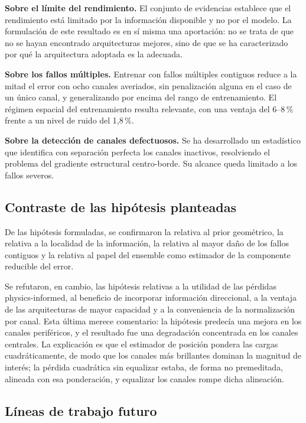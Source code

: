 \textbf{Sobre el límite del rendimiento.} El conjunto de evidencias establece que el rendimiento
está limitado por la información disponible y no por el modelo. La formulación de este resultado es
en sí misma una aportación: no se trata de que no se hayan encontrado arquitecturas mejores, sino de
que se ha caracterizado por qué la arquitectura adoptada es la adecuada.

\textbf{Sobre los fallos múltiples.} Entrenar con fallos múltiples contiguos reduce a la mitad el
error con ocho canales averiados, sin penalización alguna en el caso de un único canal, y
generalizando por encima del rango de entrenamiento. El régimen espacial del entrenamiento resulta
relevante, con una ventaja del 6--8\,\% frente a un nivel de ruido del 1,8\,\%.

\textbf{Sobre la detección de canales defectuosos.} Se ha desarrollado un estadístico que identifica
con separación perfecta los canales inactivos, resolviendo el problema del gradiente estructural
centro-borde. Su alcance queda limitado a los fallos severos.

\subsection{Contraste de las hipótesis planteadas}

De las hipótesis formuladas, se confirmaron la relativa al prior geométrico, la relativa a la
localidad de la información, la relativa al mayor daño de los fallos contiguos y la relativa al papel
del ensemble como estimador de la componente reducible del error.

Se refutaron, en cambio, las hipótesis relativas a la utilidad de las pérdidas physics-informed, al
beneficio de incorporar información direccional, a la ventaja de las arquitecturas de mayor
capacidad y a la conveniencia de la normalización por canal. Esta última merece comentario: la
hipótesis predecía una mejora en los canales periféricos, y el resultado fue una degradación
concentrada en los canales centrales. La explicación es que el estimador de posición pondera las
cargas cuadráticamente, de modo que los canales más brillantes dominan la magnitud de interés; la
pérdida cuadrática sin equalizar estaba, de forma no premeditada, alineada con esa ponderación, y
equalizar los canales rompe dicha alineación.

\subsection{Líneas de trabajo futuro}

